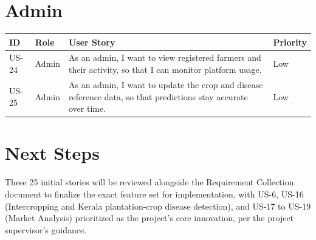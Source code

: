 \documentclass[12pt,a4paper]{article}
\begin{document}
\section{Admin}
\begin{longtable}{p{1.3cm} p{1.6cm} p{9.3cm} p{1.5cm}}
\toprule
\textbf{ID} & \textbf{Role} & \textbf{User Story} & \textbf{Priority} \\
\midrule
\endhead
US-24 & Admin & As an admin, I want to view registered farmers and their activity, so that I can monitor platform usage. & Low \\
US-25 & Admin & As an admin, I want to update the crop and disease reference data, so that predictions stay accurate over time. & Low \\
\bottomrule
\end{longtable}

\section{Next Steps}
These 25 initial stories will be reviewed alongside the Requirement Collection document to finalize the exact feature set for implementation, with US-6, US-16 (Intercropping and Kerala plantation-crop disease detection), and US-17 to US-19 (Market Analysis) prioritized as the project's core innovation, per the project supervisor's guidance.
\end{document}
